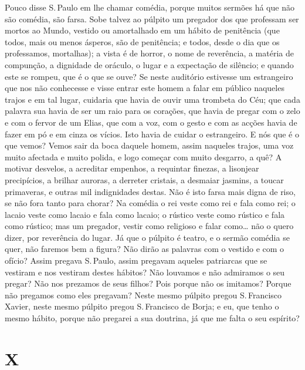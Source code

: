 Pouco disse S.\,Paulo em lhe chamar comédia, porque muitos sermões há
que não são comédia, são farsa. Sobe talvez ao púlpito um pregador dos
que professam ser mortos ao Mundo, vestido ou amortalhado em um hábito
de penitência (que todos, mais ou menos ásperos, são de penitência; e
todos, desde o dia que os professamos, mortalhas); a vista é de horror,
o nome de reverência, a matéria de compunção, a dignidade de oráculo, o
lugar e a expectação de silêncio; e quando este se rompeu, que é o que
se ouve? Se neste auditório estivesse um estrangeiro que nos não
conhecesse e visse entrar este homem a falar em público naqueles trajos
e em tal lugar, cuidaria que havia de ouvir uma trombeta do Céu; que
cada palavra sua havia de ser um raio para os corações, que havia de
pregar com o zelo e com o fervor de um Elias, que com a voz, com o gesto
e com as acções havia de fazer em pó e em cinza os vícios. Isto havia de
cuidar o estrangeiro. E nós que é o que vemos? Vemos sair da boca
daquele homem, assim naqueles trajos, uma voz muito afectada e muito
polida, e logo começar com muito desgarro, a quê? A motivar desvelos,
a acreditar empenhos, a requintar finezas, a lisonjear precipícios, a
brilhar auroras, a derreter cristais, a desmaiar jasmins, a toucar
primaveras, e outras mil indignidades destas. Não é isto farsa mais
digna de riso, se não fora tanto para chorar? Na comédia o rei veste
como rei e fala como rei; o lacaio veste como lacaio e fala como lacaio;
o rústico veste como rústico e fala como rústico; mas um pregador,
vestir como religioso e falar como\ldots{} não o quero dizer, por
reverência do lugar. Já que o púlpito é teatro, e o sermão comédia se
quer, não faremos bem a figura? Não dirão as palavras com o vestido e
com o ofício? Assim pregava S.\,Paulo, assim pregavam aqueles
patriarcas que se vestiram e nos vestiram destes hábitos? Não louvamos e
não admiramos o seu pregar? Não nos prezamos de seus filhos? Pois porque
não os imitamos? Porque não pregamos como eles pregavam? Neste mesmo
púlpito pregou S.\,Francisco Xavier, neste mesmo púlpito pregou S.\,Francisco de
Borja; e eu, que tenho o mesmo hábito, porque não pregarei a sua
doutrina, já que me falta o seu espírito?

\section*{X}

